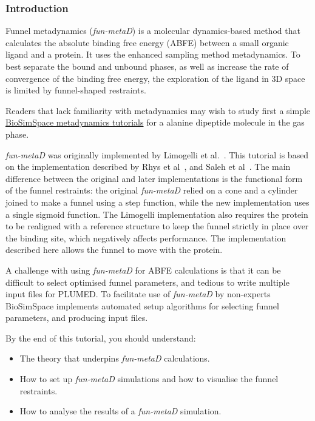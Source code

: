 \hypertarget{funnel-metadynamics-tutorial}{%
\label{funnel-metadynamics-tutorial}}
\hypertarget{Introduction}{%
\subsubsection{Introduction}\label{Introduction}}

Funnel metadynamics (\emph{fun-metaD}) is a molecular dynamics-based method that calculates the absolute binding free energy (ABFE) between a small organic ligand and a protein. It uses the enhanced sampling method metadynamics. To best separate the bound
and unbound phases, as well as increase the rate of convergence of the binding free energy, the exploration of the ligand in 3D space is limited by funnel-shaped
restraints.

Readers that lack familiarity with metadynamics may wish to study first a simple  \href{https://biosimspace.openbiosim.org/tutorials/metadynamics.html}{BioSimSpace metadynamics tutorials} for a alanine dipeptide molecule in the gas phase.

\emph{fun-metaD} was originally implemented by Limogelli et al.~\cite{Limongelli2013}. This tutorial is based on the implementation described by Rhys et al~\cite{Evans2020}, and Saleh et al~\cite{Saleh2017}. The main difference between the original and later implementations is the functional form of the funnel restraints: the original \emph{fun-metaD} relied on a cone and a cylinder joined to make a funnel using a step function, while the new implementation uses a single
sigmoid function. The Limogelli implementation also requires the protein to be realigned with a reference structure to keep the funnel strictly in place over the binding site, which negatively affects performance. The implementation described here allows the funnel to move with the protein.

A challenge with using \emph{fun-metaD} for ABFE calculations is that it can be difficult to select optimised funnel parameters, and tedious to write multiple input files for PLUMED. To facilitate use of \emph{fun-metaD} by non-experts  BioSimSpace implements automated setup algorithms for selecting funnel parameters, and producing input files. 

By the end of this tutorial, you should understand:
\begin{itemize}
\item The theory that underpins \emph{fun-metaD} calculations.
\item How to set up \emph{fun-metaD} simulations and how to
visualise the funnel restraints.
\item How to analyse the results of a \emph{fun-metaD} simulation.
\end{itemize}

